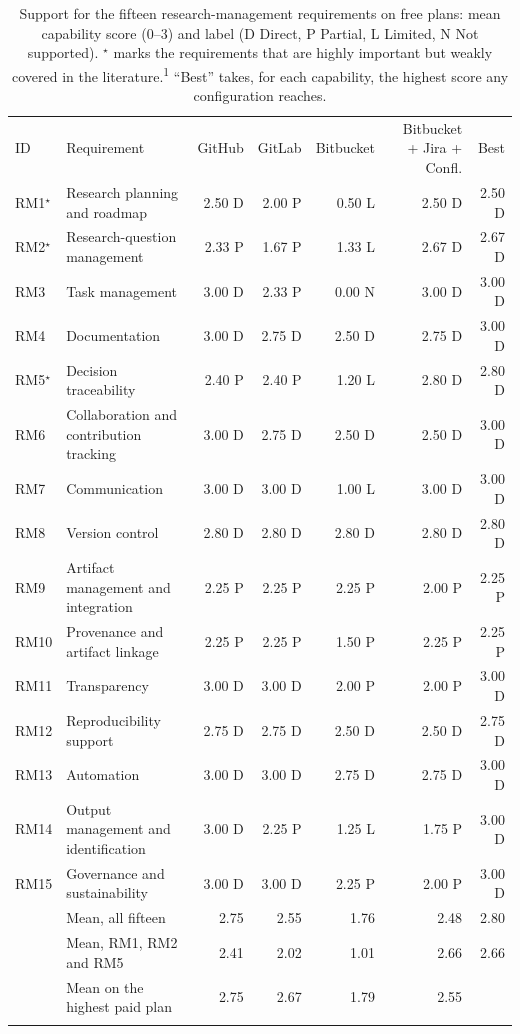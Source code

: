 \documentclass{IEEEcsmag}
\begin{document}
\begin{table}[t]
\caption{Support for the fifteen research-management requirements on free plans: mean capability score (0--3) and label (D Direct, P Partial, L Limited, N Not supported). $^\star$ marks the requirements that are highly important but weakly covered in the literature.\textsuperscript{1} ``Best'' takes, for each capability, the highest score any configuration reaches.}\label{tab:support}
\tablefont
\setlength{\tabcolsep}{4pt}
\begin{tabular*}{\textwidth}{@{\extracolsep{\fill}}p{24pt}p{146pt}<{\raggedright}rrrrr@{}}
\toprule
ID& Requirement& GitHub& GitLab& Bitbucket& Bitbucket + Jira + Confl.& Best\\
\colrule
RM1$^\star$& Research planning and roadmap& 2.50 D& 2.00 P& 0.50 L& 2.50 D& 2.50 D\\
RM2$^\star$& Research-question management& 2.33 P& 1.67 P& 1.33 L& 2.67 D& 2.67 D\\
RM3& Task management& 3.00 D& 2.33 P& 0.00 N& 3.00 D& 3.00 D\\
RM4& Documentation& 3.00 D& 2.75 D& 2.50 D& 2.75 D& 3.00 D\\
RM5$^\star$& Decision traceability& 2.40 P& 2.40 P& 1.20 L& 2.80 D& 2.80 D\\
RM6& Collaboration and contribution tracking& 3.00 D& 2.75 D& 2.50 D& 2.50 D& 3.00 D\\
RM7& Communication& 3.00 D& 3.00 D& 1.00 L& 3.00 D& 3.00 D\\
RM8& Version control& 2.80 D& 2.80 D& 2.80 D& 2.80 D& 2.80 D\\
RM9& Artifact management and integration& 2.25 P& 2.25 P& 2.25 P& 2.00 P& 2.25 P\\
RM10& Provenance and artifact linkage& 2.25 P& 2.25 P& 1.50 P& 2.25 P& 2.25 P\\
RM11& Transparency& 3.00 D& 3.00 D& 2.00 P& 2.00 P& 3.00 D\\
RM12& Reproducibility support& 2.75 D& 2.75 D& 2.50 D& 2.50 D& 2.75 D\\
RM13& Automation& 3.00 D& 3.00 D& 2.75 D& 2.75 D& 3.00 D\\
RM14& Output management and identification& 3.00 D& 2.25 P& 1.25 L& 1.75 P& 3.00 D\\
RM15& Governance and sustainability& 3.00 D& 3.00 D& 2.25 P& 2.00 P& 3.00 D\\
\colrule
& Mean, all fifteen& 2.75& 2.55& 1.76& 2.48& 2.80\\
& Mean, RM1, RM2 and RM5& 2.41& 2.02& 1.01& 2.66& 2.66\\
& Mean on the highest paid plan& 2.75& 2.67& 1.79& 2.55& \\
\botrule
\end{tabular*}
\end{table}
\end{document}
